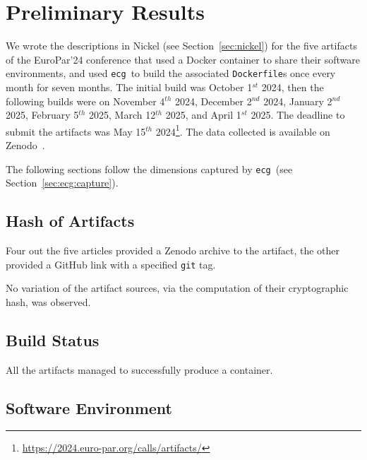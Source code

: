 \documentclass[sigconf,natbib=false]{acmart}
\newcommand{\df}{\texttt{Dockerfile}}
\newcommand{\ecg}{\texttt{ecg}}
\newcommand{\todo}[1]{{\color{red}{TODO: #1}}}
\begin{document}
\section{Preliminary Results}\label{sec:results}



We wrote the descriptions in Nickel (see Section~\ref{sec:nickel}) for the five artifacts of the EuroPar'24 conference that used a Docker container to share their software environments, and used \ecg\ to build the associated \df s once every month for seven months.
The initial build was October 1$^{st}$ 2024, then the following builds were on November 4$^{th}$ 2024, December 2$^{nd}$ 2024, January 2$^{nd}$ 2025, February 5$^{th}$ 2025, March 12$^{th}$ 2025, and April 1$^{st}$ 2025.
The deadline to submit the artifacts was May 15$^{th}$ 2024\footnote{\url{https://2024.euro-par.org/calls/artifacts/}}.
The data collected is available on Zenodo~\cite{dataset_europar24}.

The following sections follow the dimensions captured by \ecg\ (see Section~\ref{sec:ecg:capture}).

\subsection{Hash of Artifacts}

Four out the five articles provided a Zenodo archive to the artifact, the other provided a GitHub link with a specified \texttt{git} tag.

No variation of the artifact sources, via the computation of their cryptographic hash, was observed.

\subsection{Build Status}

All the artifacts managed to successfully produce a container.

\subsection{Software Environment}
\end{document}
